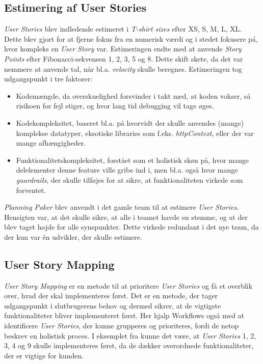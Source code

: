 \subsection{Estimering af User Stories}
\emph{User Stories} blev indledende estimeret i \emph{T-shirt sizes} efter XS, S, M, L, XL. Dette blev gjort for at fjerne fokus fra en numerisk værdi og i stedet fokusere på, hvor kompleks en \emph{User Story} var.
Estimeringen endte med at anvende \emph{Story Points} efter Fibonacci-sekvensen 1, 2, 3, 5 og 8. Dette skift skete, da det var nemmere at anvende tal, når bl.a. \emph{velocity} skulle beregnes.
Estimeringen tog udgangspunkt i tre faktorer:
\begin{itemize}
    \item Kodemængde, da overskuelighed forsvinder i takt med, at koden vokser, så risikoen for fejl stiger, og hvor lang tid debugging vil tage øges.
    \item Kodekompleksitet, baseret bl.a. på hvorvidt der skulle anvendes (mange) komplekse datatyper, eksotiske libraries som f.eks. \emph{httpContext}, eller der var mange afhængigheder.
    \item Funktionalitetskompleksitet, forstået som et holistisk skøn på, hvor mange delelementer denne feature ville gribe ind i, men bl.a. også hvor mange \emph{guardrails}, der skulle tilføjes for at sikre, at funktionaliteten virkede som forventet.
\end{itemize}
\emph{Planning Poker} blev anvendt i det gamle team til at estimere \emph{User Stories}. Hensigten var, at det skulle sikre, at alle i teamet havde en stemme, og at der blev taget højde for alle synspunkter.
Dette virkede redundant i det nye team, da der kun var én udvikler, der skulle estimere.

\subsection{User Story Mapping}
\emph{User Story Mapping} er en metode til at prioritere \emph{User Stories} og få et overblik over, hvad der skal implementeres først.
Det er en metode, der tager udgangspunkt i slutbrugerens behov og dermed sikrer, at de vigtigste funktionaliteter bliver implementeret først.
Her hjalp Workflows også med at identificere \emph{User Stories}, der kunne grupperes og prioriteres, fordi de netop beskrev en holistisk proces.
I eksemplet fra  kunne det være, at \emph{User Stories} 1, 2, 3, 4 og 9 skulle implementeres først, da de dækker overordnede funktionaliteter, der er vigtige for kunden.


